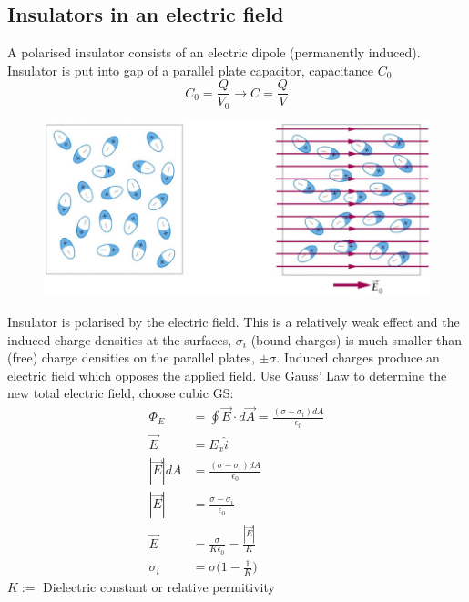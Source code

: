 \documentclass[a4paper, 11pt, normalem]{report}
\begin{document}
\section{Insulators in an electric field}
A polarised insulator consists of an electric dipole (permanently induced).
Insulator is put into gap of a parallel plate capacitor, capacitance $C_{0}$
\begin{equation}
    C_{0} = \frac{Q}{V_{0}} \to C = \frac{Q}{V}
\end{equation}
\begin{figure}[H]
    \centering
    \includegraphics[scale=0.4]{Diploes.png}
\end{figure}
Insulator is polarised by the electric field.
This is a relatively weak effect and the induced charge densities at the surfaces, $\sigma_{i}$ (bound charges) is much smaller than (free) charge densities on the parallel plates, $\pm \sigma$.
Induced charges produce an electric field which opposes the applied field.
Use Gauss' Law to determine the new total electric field, choose cubic GS:
\begin{align}
    \Phi_{E} &= \oint \vec{E} \cdot d\vec{A} = \frac{(\sigma - \sigma_{i})dA}{\epsilon_{0}} \\
    \vec{E} &= E_{x} \hat{i} \\
    |\vec{E}| dA &= \frac{(\sigma - \sigma_{i})dA}{\epsilon_{0}} \\
    |\vec{E}| &= \frac{\sigma - \sigma_{i}}{\epsilon_{0}} \\
    \vec{E} &= \frac{\sigma}{K \epsilon_{0}} = \frac{|\vec{E}|}{K} \\
    \sigma_{i} &= \sigma \Big(1 - \frac{1}{K} \Big)
\end{align}
$K :=$ Dielectric constant or relative permitivity

\chapter{}
\end{document}
